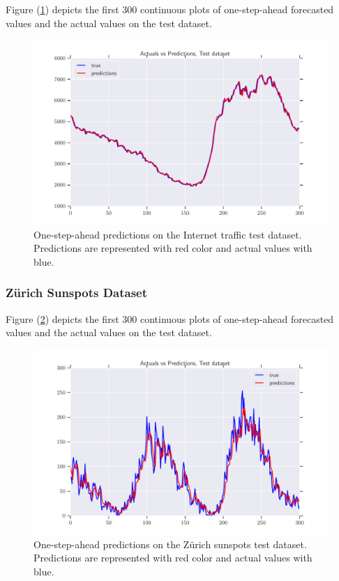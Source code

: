 \documentclass[a4paper, 12pt]{article}
\numberwithin{equation}{section}
\numberwithin{figure}{section}
\numberwithin{table}{section}
\begin{document}
	Figure (\ref{fig:internet_test_preds}) depicts the first 300 continuous plots of one-step-ahead forecasted values and the actual values on the test dataset.
	
	\begin{figure}[H]
		\centering
		\includegraphics[width=\textwidth, height=\textheight, keepaspectratio]{plots/internet/internet_300_test_preds.pdf}
		\caption[Out-of-sample one-step-ahead forecasts on the Internet Traffic dataset]{One-step-ahead predictions on the  Internet traffic test dataset. Predictions are represented with red color and actual values with blue.}
		\label{fig:internet_test_preds}
	\end{figure}

	\newpage

	\subsubsection{Zürich Sunspots Dataset}

	Figure (\ref{fig:zurich_test_preds}) depicts the first 300 continuous plots of one-step-ahead forecasted values and the actual values on the test dataset.
	
	\begin{figure}[H]
		\centering
		\includegraphics[width=\textwidth, height=\textheight, keepaspectratio]{plots/zurich/zurich_300_test_preds.pdf}
		\caption[Out-of-sample one-step-ahead forecasts on the Zürich sunspots dataset]{One-step-ahead predictions on the Zürich sunspots test dataset. Predictions are represented with red color and actual values with blue.}
		\label{fig:zurich_test_preds}
	\end{figure}
\end{document}
